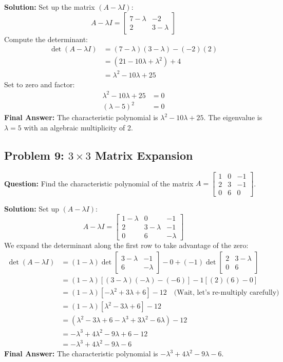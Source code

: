 \documentclass[11pt, a4paper]{article}
\theoremstyle{definition}
\theoremstyle{remark}
\begin{document}
\textbf{Solution:}
Set up the matrix $(A - \lambda I)$:
\[ A - \lambda I = \begin{bmatrix} 7 - \lambda & -2 \\ 2 & 3 - \lambda \end{bmatrix} \]
Compute the determinant:
\begin{align*}
    \det(A - \lambda I) &= (7 - \lambda)(3 - \lambda) - (-2)(2) \\
    &= (21 - 10\lambda + \lambda^2) + 4 \\
    &= \lambda^2 - 10\lambda + 25
\end{align*}
Set to zero and factor:
\begin{align*}
    \lambda^2 - 10\lambda + 25 &= 0 \\
    (\lambda - 5)^2 &= 0
\end{align*}
\textbf{Final Answer:} The characteristic polynomial is $\lambda^2 - 10\lambda + 25$. The eigenvalue is $\lambda = 5$ with an algebraic multiplicity of 2.

\subsection{Problem 9: $3 \times 3$ Matrix Expansion}
\textbf{Question:} Find the characteristic polynomial of the matrix $A = \begin{bmatrix} 1 & 0 & -1 \\ 2 & 3 & -1 \\ 0 & 6 & 0 \end{bmatrix}$.

\textbf{Solution:}
Set up $(A - \lambda I)$:
\[ A - \lambda I = \begin{bmatrix} 1 - \lambda & 0 & -1 \\ 2 & 3 - \lambda & -1 \\ 0 & 6 & -\lambda \end{bmatrix} \]
We expand the determinant along the first row to take advantage of the zero:
\begin{align*}
    \det(A - \lambda I) &= (1 - \lambda) \det \begin{bmatrix} 3 - \lambda & -1 \\ 6 & -\lambda \end{bmatrix} - 0 + (-1) \det \begin{bmatrix} 2 & 3 - \lambda \\ 0 & 6 \end{bmatrix} \\
    &= (1 - \lambda) \left[ (3 - \lambda)(-\lambda) - (-6) \right] - 1 \left[ (2)(6) - 0 \right] \\
    &= (1 - \lambda) \left[ -\lambda^2 + 3\lambda + 6 \right] - 12 \quad \text{(Wait, let's re-multiply carefully)} \\
    &= (1 - \lambda) \left[ \lambda^2 - 3\lambda + 6 \right] - 12 \\
    &= \left( \lambda^2 - 3\lambda + 6 - \lambda^3 + 3\lambda^2 - 6\lambda \right) - 12 \\
    &= -\lambda^3 + 4\lambda^2 - 9\lambda + 6 - 12 \\
    &= -\lambda^3 + 4\lambda^2 - 9\lambda - 6
\end{align*}
\textbf{Final Answer:} The characteristic polynomial is $-\lambda^3 + 4\lambda^2 - 9\lambda - 6$.
\end{document}

